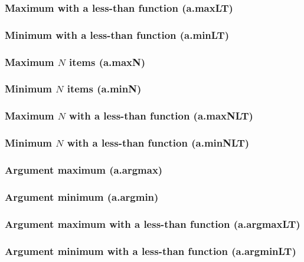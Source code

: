 \documentclass{article}
\theoremstyle{definition}
\begin{document}
\subsubsection{Maximum with a less-than function (a.maxLT)}

\subsubsection{Minimum with a less-than function (a.minLT)}

\subsubsection{Maximum $N$ items (a.maxN)}

\subsubsection{Minimum $N$ items (a.minN)}

\subsubsection{Maximum $N$ with a less-than function (a.maxNLT)}

\subsubsection{Minimum $N$ with a less-than function (a.minNLT)}

\subsubsection{Argument maximum (a.argmax)}

\subsubsection{Argument minimum (a.argmin)}

\subsubsection{Argument maximum with a less-than function (a.argmaxLT)}

\subsubsection{Argument minimum with a less-than function (a.argminLT)}
\end{document}
